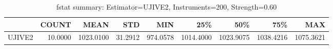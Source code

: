 \begin{table}[ht]
\centering
\caption{fstat summary: Estimator=UJIVE2, Instruments=200, Strength=0.60}
\begin{tabular}{lrrrrrrrr}
\toprule
 & COUNT & MEAN & STD & MIN & 25\% & 50\% & 75\% & MAX \\
\midrule
UJIVE2 & 10.0000 & 1023.0100 & 31.2912 & 974.0578 & 1014.4000 & 1023.9075 & 1038.4216 & 1075.3621 \\
\bottomrule
\end{tabular}
\end{table}
